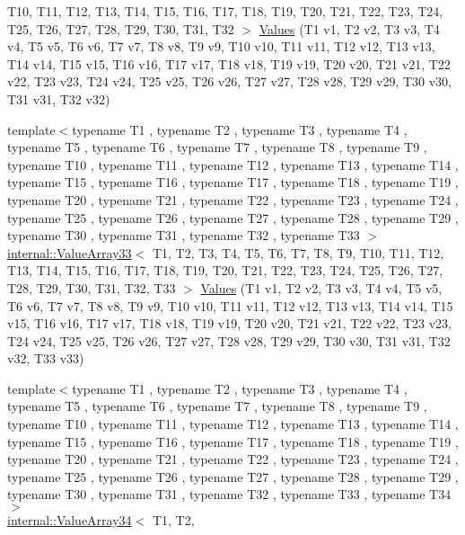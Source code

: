 \begin{DoxyCompactItemize}
\-T10, \-T11, \-T12, \-T13, \-T14, \-T15, \*
\-T16, \-T17, \-T18, \-T19, \-T20, \-T21, \*
\-T22, \-T23, \-T24, \-T25, \-T26, \-T27, \*
\-T28, \-T29, \-T30, \-T31, \-T32 $>$ \hyperlink{namespacetesting_afeff614d4c808c753bbfa208409ad664}{\-Values} (\-T1 v1, \-T2 v2, \-T3 v3, \-T4 v4, \-T5 v5, \-T6 v6, \-T7 v7, \-T8 v8, \-T9 v9, \-T10 v10, \-T11 v11, \-T12 v12, \-T13 v13, \-T14 v14, \-T15 v15, \-T16 v16, \-T17 v17, \-T18 v18, \-T19 v19, \-T20 v20, \-T21 v21, \-T22 v22, \-T23 v23, \-T24 v24, \-T25 v25, \-T26 v26, \-T27 v27, \-T28 v28, \-T29 v29, \-T30 v30, \-T31 v31, \-T32 v32)
\item 
{\footnotesize template$<$typename T1 , typename T2 , typename T3 , typename T4 , typename T5 , typename T6 , typename T7 , typename T8 , typename T9 , typename T10 , typename T11 , typename T12 , typename T13 , typename T14 , typename T15 , typename T16 , typename T17 , typename T18 , typename T19 , typename T20 , typename T21 , typename T22 , typename T23 , typename T24 , typename T25 , typename T26 , typename T27 , typename T28 , typename T29 , typename T30 , typename T31 , typename T32 , typename T33 $>$ }\\\hyperlink{classtesting_1_1internal_1_1ValueArray33}{internal\-::\-Value\-Array33}$<$ \-T1, \-T2, \*
\-T3, \-T4, \-T5, \-T6, \-T7, \-T8, \-T9, \*
\-T10, \-T11, \-T12, \-T13, \-T14, \-T15, \*
\-T16, \-T17, \-T18, \-T19, \-T20, \-T21, \*
\-T22, \-T23, \-T24, \-T25, \-T26, \-T27, \*
\-T28, \-T29, \-T30, \-T31, \-T32, \-T33 $>$ \hyperlink{namespacetesting_ac972228f2ff86974ab6591a10512326a}{\-Values} (\-T1 v1, \-T2 v2, \-T3 v3, \-T4 v4, \-T5 v5, \-T6 v6, \-T7 v7, \-T8 v8, \-T9 v9, \-T10 v10, \-T11 v11, \-T12 v12, \-T13 v13, \-T14 v14, \-T15 v15, \-T16 v16, \-T17 v17, \-T18 v18, \-T19 v19, \-T20 v20, \-T21 v21, \-T22 v22, \-T23 v23, \-T24 v24, \-T25 v25, \-T26 v26, \-T27 v27, \-T28 v28, \-T29 v29, \-T30 v30, \-T31 v31, \-T32 v32, \-T33 v33)
\item 
{\footnotesize template$<$typename T1 , typename T2 , typename T3 , typename T4 , typename T5 , typename T6 , typename T7 , typename T8 , typename T9 , typename T10 , typename T11 , typename T12 , typename T13 , typename T14 , typename T15 , typename T16 , typename T17 , typename T18 , typename T19 , typename T20 , typename T21 , typename T22 , typename T23 , typename T24 , typename T25 , typename T26 , typename T27 , typename T28 , typename T29 , typename T30 , typename T31 , typename T32 , typename T33 , typename T34 $>$ }\\\hyperlink{classtesting_1_1internal_1_1ValueArray34}{internal\-::\-Value\-Array34}$<$ \-T1, \-T2, \*

\end{DoxyCompactItemize}
